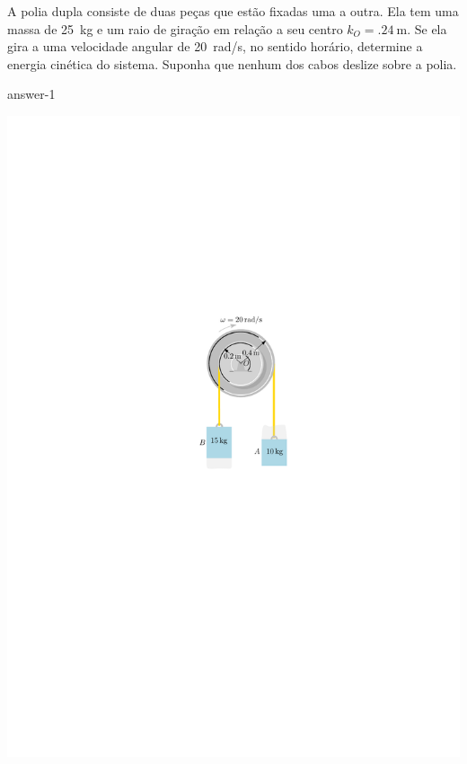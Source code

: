 \begin{minipage}{.6\linewidth}
	\vspace{-4cm}
	\item A polia dupla consiste de duas peças que estão fixadas uma a outra. Ela tem uma massa de \SI{25}{\kilogram} e um raio de giração em relação a seu centro $k_{O}=\SI{.24}{\meter}$. Se ela gira a uma velocidade angular de \SI{20}{\radian/\second},
	no sentido horário, determine a energia cinética do sistema.
	Suponha que nenhum dos cabos deslize sobre a polia.
	
	{answer-1}
\end{minipage}
\begin{minipage}{.4\linewidth}
	\begin{flushright}
		\includegraphics[scale=1.2]{../../images/draw_1}
	\end{flushright}
\end{minipage}